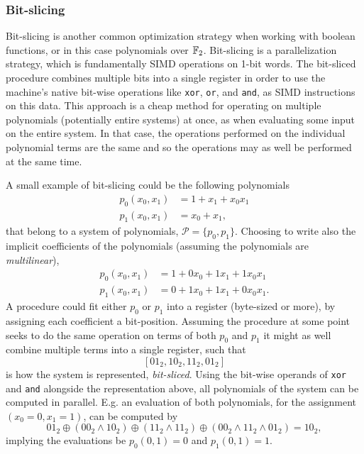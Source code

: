 \subsubsection{Bit-slicing}
Bit-slicing is another common optimization strategy when working with boolean functions, or in this case polynomials over $\mathbb{F}_2$. Bit-slicing is a parallelization strategy, which is fundamentally SIMD operations on 1-bit words. The bit-sliced procedure combines multiple bits into a single register in order to use the machine's native bit-wise operations like \texttt{xor}, \texttt{or}, and \texttt{and}, as SIMD instructions on this data. This approach is a cheap method for operating on multiple polynomials (potentially entire systems) at once, as when evaluating some input on the entire system. In that case, the operations performed on the individual polynomial terms are the same and so the operations may as well be performed at the same time.

A small example of bit-slicing could be the following polynomials
\begin{equation*}
    \begin{split}
        p_0(x_0, x_1) &= 1 + x_1 + x_0x_1\\
        p_1(x_0, x_1) &= x_0 + x_1,
    \end{split}
\end{equation*} 
that belong to a system of polynomials, $\mathcal{P} = \{p_0, p_1\}$. Choosing to write also the implicit coefficients of the polynomials (assuming the polynomials are \textit{multilinear}),
\begin{equation*}
    \begin{split}
        p_0(x_0, x_1) &= 1 + 0x_0 + 1x_1 + 1x_0x_1\\
        p_1(x_0, x_1) &= 0 + 1x_0 + 1x_1 + 0x_0x_1.
    \end{split}
\end{equation*} 
A procedure could fit either $p_0$ or $p_1$ into a register (byte-sized or more), by assigning each coefficient a bit-position. Assuming the procedure at some point seeks to do the same operation on terms of both $p_0$ and $p_1$ it might as well combine multiple terms into a single register, such that 
$$
    [01_2, 10_2, 11_2, 01_2]
$$
is how the system is represented, \textit{bit-sliced}. Using the bit-wise operands of \texttt{xor} and \texttt{and} alongside the representation above, all polynomials of the system can be computed in parallel. E.g. an evaluation of both polynomials, for the assignment $(x_0 = 0, x_1 = 1)$, can be computed by
\begin{equation*}
                01_2 \oplus (00_2 \wedge 10_2) \oplus (11_2 \wedge 11_2) \oplus (00_2 \wedge 11_2 \wedge 01_2) = 10_2,
\end{equation*}
implying the evaluations be $p_0(0,1) = 0$ and $p_1(0,1) = 1$.

